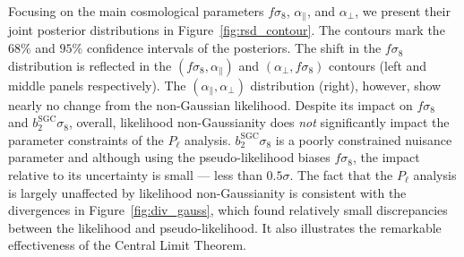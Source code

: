 \documentclass[12pt, letterpaper, preprint]{aastex}
\newcommand{\todo}[1]{{\bf \textcolor{red}{#1}}}
\newcommand{\Beut}{\citetalias{beutler2017}}
\begin{document}
Focusing on the main cosmological parameters $f \sigma_8$, 
$\alpha_\parallel$, and $\alpha_\perp$, we present their 
joint posterior distributions in Figure~\ref{fig:rsd_contour}.  
The contours mark the $68\%$ and $95\%$ confidence intervals
of the posteriors. The shift in the $f \sigma_8$ distribution 
is reflected in the
$(f\sigma_8, \alpha_\parallel)$ and $(\alpha_\perp, f\sigma_8)$ 
contours (left and middle panels respectively). The 
$(\alpha_\parallel, \alpha_\perp)$ distribution (right), however, show nearly 
no change from the non-Gaussian likelihood. %
Despite its impact on $f \sigma_8$ and $b_2^\mathrm{SGC} \sigma_8$, 
overall, likelihood non-Gaussianity does \emph{not}
significantly impact the parameter constraints of the $P_\ell$ 
analysis. $b_2^\mathrm{SGC} \sigma_8$ is a poorly constrained nuisance 
parameter and although using the pseudo-likelihood biases $f \sigma_8$, 
the impact relative to its uncertainty is small --- less than $0.5 \sigma$. 
The fact that the $P_\ell$ analysis is largely unaffected by likelihood 
non-Gaussianity is consistent with the divergences in 
Figure~\ref{fig:div_gauss}, which found relatively small discrepancies 
between the likelihood and pseudo-likelihood. It also illustrates
the remarkable effectiveness of the Central Limit Theorem. %

\end{document}
